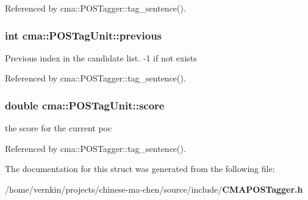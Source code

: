 Referenced by cma::POSTagger::tag\_\-sentence().
\subsubsection[{previous}]{\setlength{\rightskip}{0pt plus 5cm}int {\bf cma::POSTagUnit::previous}}\label{structcma_1_1POSTagUnit_f11c0faeb5fb6c58348768403a9714a9}


Previous index in the candidate list. -1 if not exists 

Referenced by cma::POSTagger::tag\_\-sentence().
\subsubsection[{score}]{\setlength{\rightskip}{0pt plus 5cm}double {\bf cma::POSTagUnit::score}}\label{structcma_1_1POSTagUnit_8256b2cd6fab35e40cc1bc2dd3b39ce2}


the score for the current poc 

Referenced by cma::POSTagger::tag\_\-sentence().

The documentation for this struct was generated from the following file:\begin{CompactItemize}
\item 
/home/vernkin/projects/chinese-ma-chen/source/include/{\bf CMAPOSTagger.h}\end{CompactItemize}
